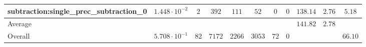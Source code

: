 \begin{tabular}{|l|c|c|c|c|c|c|c|c|c|c|}
subtraction:single\_prec\_subtraction\_0         & $ 1.448 \cdot 10^{-2} $ & $ 2      $ & $ 392  $ & $ 111  $ & $ 52    $ & $ 0  $ & $ 0 $ & $ 138.14      $ & $ 2.76    $ & $ 5.18    $ \\
\hline
Average                                          & $                     $ & $        $ & $      $ & $      $ & $       $ & $    $ & $   $ & $ 141.82      $ & $ 2.78    $ & $         $ \\
\hline
Overall                                          & $ 5.708 \cdot 10^{-1} $ & $ 82     $ & $ 7172 $ & $ 2266 $ & $ 3053  $ & $ 72 $ & $ 0 $ & $             $ & $         $ & $ 66.10   $ \\
\hline
\end{tabular}
